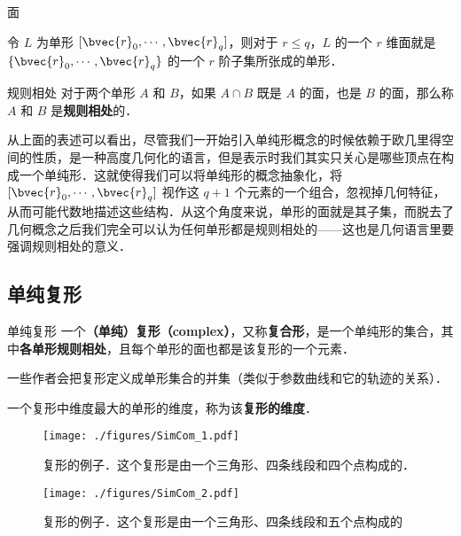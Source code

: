 \begin{definition}{面}

令 $L$ 为单形 $[\bvec{r}_0, \cdots, \bvec{r}_q]$，则对于 $r\leq q$，$L$ 的一个 $r$ 维面就是 $\{\bvec{r}_0, \cdots, \bvec{r}_q\}$ 的一个 $r$ 阶子集所张成的单形．

\end{definition}


\begin{definition}{规则相处}
对于两个单形 $A$ 和 $B$，如果 $A\cap B$ 既是 $A$ 的面，也是 $B$ 的面，那么称 $A$ 和 $B$ 是\textbf{规则相处}的．
\end{definition}


从上面的表述可以看出，尽管我们一开始引入单纯形概念的时候依赖于欧几里得空间的性质，是一种高度几何化的语言，但是表示时我们其实只关心是哪些顶点在构成一个单纯形．这就使得我们可以将单纯形的概念抽象化，将 $[\bvec{r}_0, \cdots, \bvec{r}_q]$ 视作这 $q+1$ 个元素的一个组合，忽视掉几何特征，从而可能代数地描述这些结构．从这个角度来说，单形的面就是其子集，而脱去了几何概念之后我们完全可以认为任何单形都是规则相处的——这也是几何语言里要强调规则相处的意义．

\subsection{单纯复形}

\begin{definition}{单纯复形}
一个\textbf{（单纯）复形（complex）}，又称\textbf{复合形}，是一个单纯形的集合，其中\textbf{各单形规则相处}，且每个单形的面也都是该复形的一个元素．

一些作者会把复形定义成单形集合的并集（类似于参数曲线和它的轨迹的关系）．

一个复形中维度最大的单形的维度，称为该\textbf{复形的维度}．
\end{definition}

\begin{figure}[ht]
\centering
\texttt{[image: ./figures/SimCom\_1.pdf]}
\caption{复形的例子．这个复形是由一个三角形、四条线段和四个点构成的．} \label{SimCom_fig1}
\end{figure}

\begin{figure}[ht]
\centering
\texttt{[image: ./figures/SimCom\_2.pdf]}
\caption{复形的例子．这个复形是由一个三角形、四条线段和五个点构成的} \label{SimCom_fig2}
\end{figure}


